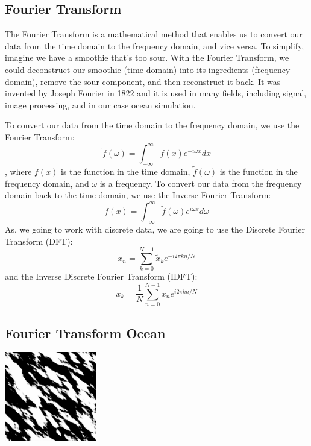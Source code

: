 \subsection{Fourier Transform}
The Fourier Transform is a mathematical method that enables us to convert our data from the time domain to the frequency domain, and vice versa. To simplify, imagine we have a smoothie that’s too sour. With the Fourier Transform, we could deconstruct our smoothie (time domain) into its ingredients (frequency domain), remove the sour component, and then reconstruct it back.
It was invented by Joseph Fourier\cite{fourier1822} in 1822 and it is used in many fields, including signal, image processing, and in our case ocean simulation.

To convert our data from the time domain to the frequency domain, we use the Fourier Transform:
\begin{equation}
\tilde{f}(\omega) = \int_{-\infty}^{\infty} f(x) e^{-i \omega x} dx
\end{equation}
, where $f(x)$ is the function in the time domain, $\tilde{f}(\omega)$ is the function in the frequency domain, and $\omega$ is a frequency.
To convert our data from the frequency domain back to the time domain, we use the Inverse Fourier Transform:
\begin{equation}
f(x) = \int_{-\infty}^{\infty} \tilde{f}(\omega) e^{i \omega x} d\omega
\end{equation}
As, we going to work with discrete data, we are going to use the Discrete Fourier Transform (DFT):
\begin{equation}
    x_n = \sum_{k=0}^{N-1} \tilde{x}_k e^{-i 2 \pi k n / N}
\end{equation}
and the Inverse Discrete Fourier Transform (IDFT):
\begin{equation}
    \tilde{x}_k = \frac{1}{N} \sum_{n=0}^{N-1} x_n e^{i 2 \pi k n / N}
    \label{eq:idft}
\end{equation}

\subsection{Fourier Transform Ocean}

\begin{minipage}{1\textwidth}
    \centering
    \includegraphics[width=0.3\textwidth]{"images/philips_height_map.png"}
    \label{fig:tessendorf_height}
\end{minipage}

